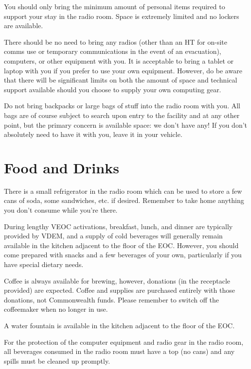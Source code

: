 \documentclass[pdflatex,letterpaper,twoside,12pt]{book}
\begin{document}
You should only bring the minimum amount of personal items required to support your stay in the radio room.  Space is extremely limited and no lockers are available.

There should be no need to bring any radios (other than an HT for on-site comms use or temporary communications in the event of an evacuation), computers, or other equipment with you.  It is acceptable to bring a tablet or laptop with you if you prefer to use your own equipment.  However, do be aware that there will be significant limits on both the amount of space and technical support available should you choose to supply your own computing gear.

Do not bring backpacks or large bags of stuff into the radio room with you.  All bags are of course subject to search upon entry to the facility and at any other point, but the primary concern is available space: we don't have any!  If you don't absolutely need to have it with you, leave it in your vehicle.


\section{Food and Drinks}

There is a small refrigerator in the radio room which can be used to store a few cans of soda, some sandwiches, etc. if desired.  Remember to take home anything you don't consume while you're there.

During lengthy VEOC activations, breakfast, lunch, and dinner are typically provided by VDEM, and a supply of cold beverages will generally remain available in the kitchen adjacent to the floor of the EOC.  However, you should come prepared with snacks and a few beverages of your own, particularly if you have special dietary needs.

Coffee is always available for brewing, however, donations (in the receptacle provided) are expected.  Coffee and supplies are purchased entirely with those donations, not Commonwealth funds.  Please remember to switch off the coffeemaker when no longer in use.

A water fountain is available in the kitchen adjacent to the floor of the EOC.

For the protection of the computer equipment and radio gear in the radio room, all beverages consumed in the radio room must have a top (no cans) and any spills must be cleaned up promptly.
\end{document}
